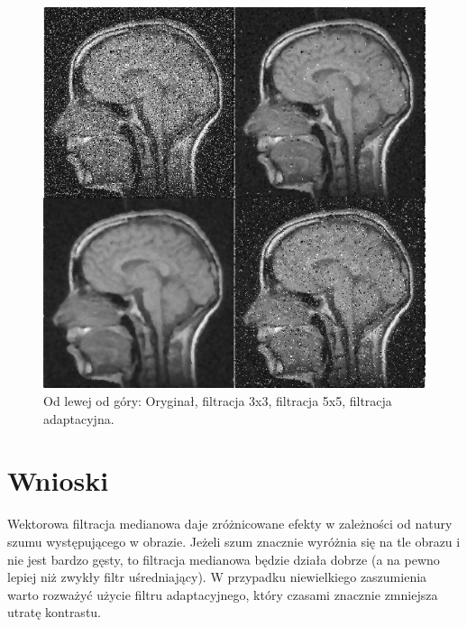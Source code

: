 \documentclass[a4paper,12pt,oneside,notitlepage,onecolumn]{article}
\begin{document}
\begin{figure}
\centering
\includegraphics[width=13cm]{test5_final.JPG}
\caption{Od lewej od góry: Oryginał, filtracja 3x3, filtracja 5x5, filtracja adaptacyjna.}
\end{figure}

\section{Wnioski}
Wektorowa filtracja medianowa daje zróżnicowane efekty w zależności od natury szumu występującego w obrazie.
Jeżeli szum znacznie wyróżnia się na tle obrazu i nie jest bardzo gęsty, to filtracja medianowa będzie działa dobrze (a na pewno lepiej niż zwykły filtr uśredniający).
W przypadku niewielkiego zaszumienia warto rozważyć użycie filtru adaptacyjnego, który czasami znacznie zmniejsza utratę kontrastu.
\end{document}
